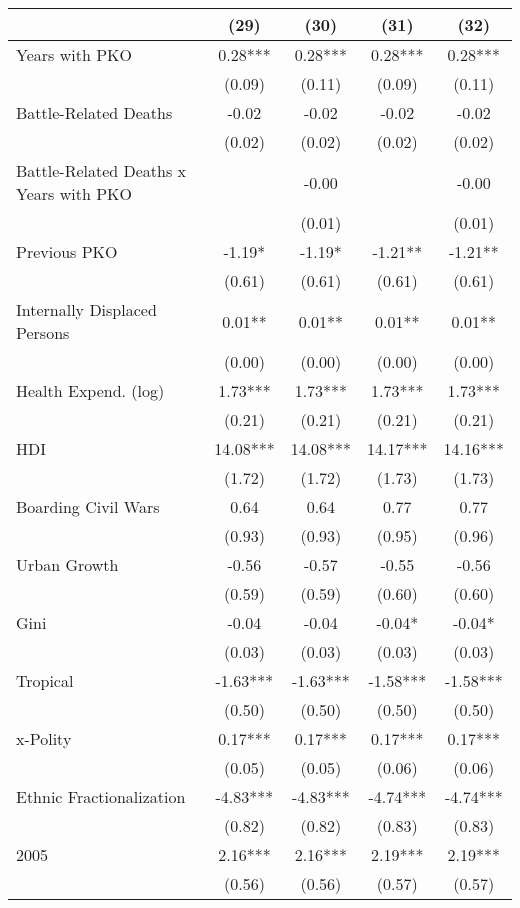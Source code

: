 \begin{table}[H]
\centering
\begin{tabular}[t]{lcccc}
\toprule
  & (29) & (30) & (31) & (32)\\
\midrule
Years with PKO & 0.28*** & 0.28*** & 0.28*** & 0.28***\\
 & (0.09) & (0.11) & (0.09) & (0.11)\\
Battle-Related Deaths & -0.02 & -0.02 & -0.02 & -0.02\\
 & (0.02) & (0.02) & (0.02) & (0.02)\\
Battle-Related Deaths x Years with PKO &  & -0.00 &  & -0.00\\
 &  & (0.01) &  & (0.01)\\
Previous PKO & -1.19* & -1.19* & -1.21** & -1.21**\\
 & (0.61) & (0.61) & (0.61) & (0.61)\\
Internally Displaced Persons & 0.01** & 0.01** & 0.01** & 0.01**\\
 & (0.00) & (0.00) & (0.00) & (0.00)\\
Health Expend. (log) & 1.73*** & 1.73*** & 1.73*** & 1.73***\\
 & (0.21) & (0.21) & (0.21) & (0.21)\\
HDI & 14.08*** & 14.08*** & 14.17*** & 14.16***\\
 & (1.72) & (1.72) & (1.73) & (1.73)\\
Boarding Civil Wars & 0.64 & 0.64 & 0.77 & 0.77\\
 & (0.93) & (0.93) & (0.95) & (0.96)\\
Urban Growth & -0.56 & -0.57 & -0.55 & -0.56\\
 & (0.59) & (0.59) & (0.60) & (0.60)\\
Gini & -0.04 & -0.04 & -0.04* & -0.04*\\
 & (0.03) & (0.03) & (0.03) & (0.03)\\
Tropical & -1.63*** & -1.63*** & -1.58*** & -1.58***\\
 & (0.50) & (0.50) & (0.50) & (0.50)\\
x-Polity & 0.17*** & 0.17*** & 0.17*** & 0.17***\\
 & (0.05) & (0.05) & (0.06) & (0.06)\\
Ethnic Fractionalization & -4.83*** & -4.83*** & -4.74*** & -4.74***\\
 & (0.82) & (0.82) & (0.83) & (0.83)\\
2005 & 2.16*** & 2.16*** & 2.19*** & 2.19***\\
 & (0.56) & (0.56) & (0.57) & (0.57)\\

\end{tabular}
\end{table}
